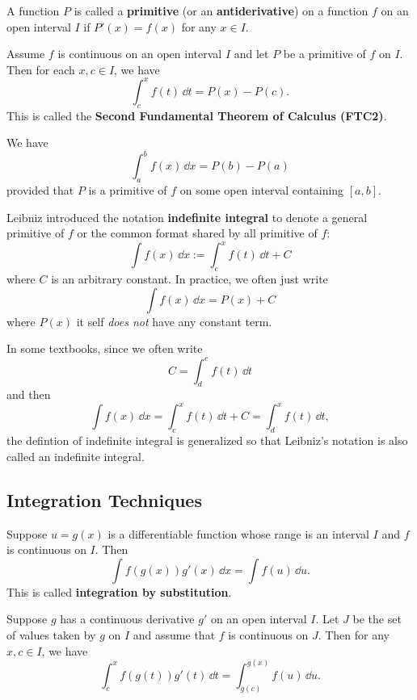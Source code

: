 \documentclass[a4paper]{ctexart}
\begin{document}
	\begin{mydef}
		A function $P$ is called a \textbf{primitive} (or an \textbf{antiderivative}) on a function $f$ on an open interval $I$ if $P'(x)=f(x)$ for any $x\in I$. 
	\end{mydef}
	\begin{mythm}
		Assume $f$ is continuous on an open interval $I$ and let $P$ be a primitive of $f$ on $I$. Then for each $x,c \in I$, we have
		\[
		\int_c^x f(t)\, \dd t = P(x) - P(c).
		\]
		This is called the \textbf{Second Fundamental Theorem of Calculus (FTC2)}.
	\end{mythm}
	\begin{myrmk}
		We have 
		\[
		\int_a^b f(x)\, \dd x = P(b) - P(a)
		\]
		provided that $P$ is a primitive of $f$ on some open interval containing $[a,b]$.
	\end{myrmk}
	\begin{mynot}
		Leibniz introduced the notation \textbf{indefinite integral} to denote a general primitive of $f$ or the common format shared by all primitive of $f$:
		\[
		\int f(x)\, \dd x := \int_c^x f(t)\, \dd t + C
		\]
		where $C$ is an arbitrary constant. In practice, we often just write
		\[
		\int f(x)\, \dd x = P(x) + C
		\]
		where $P(x)$ it self \emph{does not} have any constant term.
	\end{mynot}
	\begin{myrmk}
		In some textbooks, since we often write
		\[
		C=\int_d^c f(t)\, \dd t
		\]
		and then 
		\[
		\int f(x)\, \dd x =\int_c^x f(t)\, \dd t + C = \int_d^x f(t)\, \dd t,
		\]
		the defintion of indefinite integral is generalized so that Leibniz's notation is also called an indefinite integral.
	\end{myrmk}

	\subsection{Integration Techniques}
	\begin{mymthd}
		Suppose $u=g(x)$ is a differentiable function whose range is an interval $I$ and $f$ is continuous on $I$. Then
		\[
		\int f(g(x)) g'(x)\, \dd x = \int f(u)\, \dd u.
		\]
		This is called \textbf{integration by substitution}.
	\end{mymthd}
	\begin{mythm}
		Suppose $g$ has a continuous derivative $g'$ on an open interval $I$. Let $J$ be the set of values taken by $g$ on $I$ and assume that $f$ is continuous on $J$. Then for any $x,c\in I$, we have
		\[
		\int_c^x f(g(t)) g'(t)\, \dd t = \int_{g(c)}^{g(x)} f(u)\, \dd u.
		\]
	\end{mythm}
\end{document}
